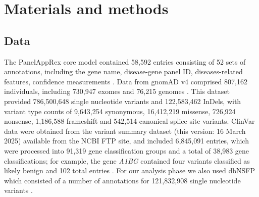 %
%
%


\section{Materials and methods}

\subsection{Data}
The PanelAppRex core model contained 58,592 entries consisting of 52 sets of annotations, including the gene name, disease-gene panel ID, diseases-related features, confidence measurements \cite{lawless_panelapprex_2025}.
Data from gnomAD v4 comprised 807,162 individuals, including 730,947 exomes and 76,215 genomes \cite{karczewski2020mutational}. This dataset provided 786,500,648 single nucleotide variants and 122,583,462 InDels, with variant type counts of 9,643,254 synonymous, 16,412,219 missense, 726,924 nonsense, 1,186,588 frameshift and 542,514 canonical splice site variants. ClinVar data were obtained from the variant summary dataset (this version: 16 March 2025) available from the NCBI FTP site, and included 6,845,091 entries, which were processed into 91,319 gene classification groups and a total of 38,983 gene classifications; for example, the gene \textit{A1BG} contained four variants classified as likely benign and 102 total entries \cite{landrum_clinvar_2018}. For our analysis phase we also used dbNSFP which consisted of a number of annotations for 121,832,908 single nucleotide variants 
\cite{liu_dbnsfp_2020}. 

